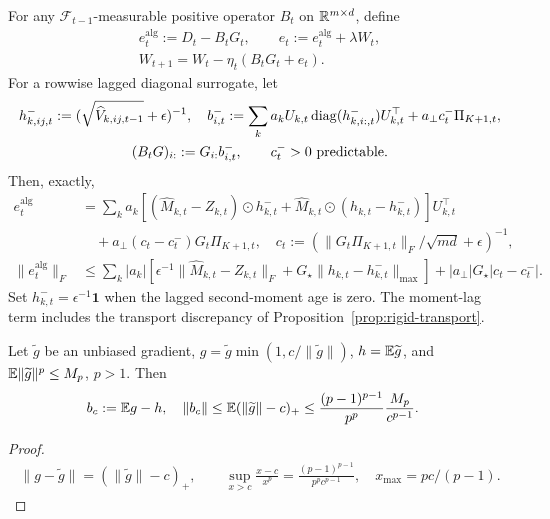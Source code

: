 \begin{definition}\label{def:rigid-error}
For any $\mathcal F_{t-1}$-measurable positive operator $B_t$ on
$\mathbb R^{m\times d}$, define
\begin{gather}
 e_t^{\mathrm{alg}}:=D_t-B_tG_t,\qquad
 e_t:=e_t^{\mathrm{alg}}+\lambda W_t,\\
 W_{t+1}=W_t-\eta_t(B_tG_t+e_t).
\end{gather}
For a rowwise lagged diagonal surrogate, let
\begin{gather}
 h_{k,ij,t}^-:=(\sqrt{\widehat V_{k,ij,t-1}}+\epsilon)^{-1},\quad
 b_{i,t}^-:=\sum_k a_k U_{k,t}\operatorname{diag}(h_{k,i:,t}^-)U_{k,t}^\top
                     +a_\perp c_t^-\Pi_{K+1,t},\\
 (B_tG)_{i:}:=G_{i:}b_{i,t}^-,\qquad c_t^->0\text{ predictable}.
\end{gather}
Then, exactly,
\begin{align}
 e_t^{\mathrm{alg}}
 &=\sum_k a_k\left[
 (\widehat M_{k,t}-Z_{k,t})\odot h_{k,t}^-
 +\widehat M_{k,t}\odot(h_{k,t}-h_{k,t}^-)
 \right]U_{k,t}^\top\\
 &\quad+a_\perp(c_t-c_t^-)G_t\Pi_{K+1,t},\quad
 c_t:=(\|G_t\Pi_{K+1,t}\|_F/\sqrt{md}+\epsilon)^{-1},\\
 \|e_t^{\mathrm{alg}}\|_F
 &\le\sum_k|a_k|\left[
 \epsilon^{-1}\|\widehat M_{k,t}-Z_{k,t}\|_F+
 G_\star\|h_{k,t}-h_{k,t}^-\|_{\max}\right]
 +|a_\perp|G_\star|c_t-c_t^-|.
\end{align}
Set $h_{k,t}^-=\epsilon^{-1}\mathbf1$ when the lagged second-moment age is zero.
The moment-lag term includes the transport discrepancy of
Proposition~\ref{prop:rigid-transport}.
\end{definition}
\begin{lemma}\label{lem:rigid-clipping}
Let $\widetilde g$ be an unbiased gradient, $g=\widetilde g\min(1,c/\|\widetilde g\|)$,
$h=\mathbb E\widetilde g$, and $\mathbb E\|\widetilde g\|^p\le M_p$, $p>1$. Then
\begin{align}
 b_c&:=\mathbb E g-h,\quad
 \|b_c\|\le\mathbb E(\|\widetilde g\|-c)_+
 \le\frac{(p-1)^{p-1}}{p^p}\frac{M_p}{c^{p-1}}.
\end{align}
\end{lemma}
\begin{proof}
\begin{gather}
 \|g-\widetilde g\|=(\|\widetilde g\|-c)_+,\qquad
 \sup_{x>c}\frac{x-c}{x^p}
 =\frac{(p-1)^{p-1}}{p^pc^{p-1}},\quad x_{\max}=pc/(p-1).
\end{gather}
\end{proof}
